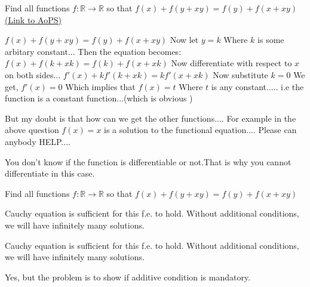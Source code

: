 \begin{problem}
	Find all functions $f:\mathbb R \longrightarrow \mathbb R$ so that 
$f(x)+f(y+xy)=f(y)+f(x+xy)$
	\flushright \href{https://artofproblemsolving.com/community/c6h535577}{(Link to AoPS)}
\end{problem}



\begin{solution}
	$ f(x)+f(y+xy)=f(y)+f(x+xy) $
Now let $y=k$ Where $k$ is some arbitary constant...
Then the equation becomes:
$ f(x)+f(k+xk)=f(k)+f(x+xk) $
Now differentiate with respect to $x$ on both sides...
$f'(x)+kf'(k+xk)=kf'(x+xk)$
Now substitute $k=0$
We get, $f'(x)=0$
Which implies that 
$f(x)=t$ Where $t$ is any constant..... i.e the function is a constant function...(which is obvious )


But my doubt is that how can we get the other functions.... For example in the above question $f(x)=x$ is a solution to the functional equation....
Please can anybody HELP....
\end{solution}



\begin{solution}
	You don't know if the function is differentiable or not.That is why you cannot differentiate in this case.
\end{solution}



\begin{solution}
	\begin{tcolorbox}Find all functions $f:\mathbb R \longrightarrow \mathbb R$ so that 
$f(x)+f(y+xy)=f(y)+f(x+xy)$\end{tcolorbox}

Cauchy equation is sufficient for this f.e. to hold. Without additional conditions, we will have infinitely many solutions.
\end{solution}



\begin{solution}
	\begin{tcolorbox}Cauchy equation is sufficient for this f.e. to hold. Without additional conditions, we will have infinitely many solutions.\end{tcolorbox}
Yes, but the problem is to show if additive condition is mandatory.
\end{solution}




